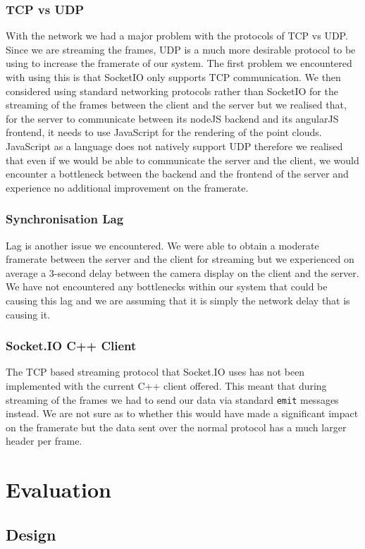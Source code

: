 \documentclass{article}
\begin{document}
\subsubsection{TCP vs UDP}
With the network we had a major problem with the protocols of TCP vs UDP. Since we are streaming the frames, UDP is a much more desirable protocol to be using to increase the framerate of our system. The first problem we encountered with using this is that SocketIO only supports TCP communication. We then considered using standard networking protocols rather than SocketIO for the streaming of the frames between the client and the server but we realised that, for the server to communicate between its nodeJS backend and its angularJS frontend, it needs to use JavaScript for the rendering of the point clouds. JavaScript as a language does not natively support UDP therefore we realised that even if we would be able to communicate the server and the client, we would encounter a bottleneck between the backend and the frontend of the server and experience no additional improvement on the framerate.
\subsubsection{Synchronisation Lag}
Lag is another issue we encountered. We were able to obtain a moderate framerate between the server and the client for streaming but we experienced on average a 3-second delay between the camera display on the client and the server. We have not encountered any bottlenecks within our system that could be causing this lag and we are assuming that it is simply the network delay that is causing it.
\subsubsection{Socket.IO C++ Client}
The TCP based streaming protocol that Socket.IO uses has not been implemented with the current C++ client offered.
This meant that during streaming of the frames we had to send our data via standard \texttt{emit} messages instead. We are not sure as to whether this would have made a significant impact on the framerate but the data sent over the normal protocol has a much larger header per frame.
\newpage
\section{Evaluation}
\subsection{Design}
\end{document}
